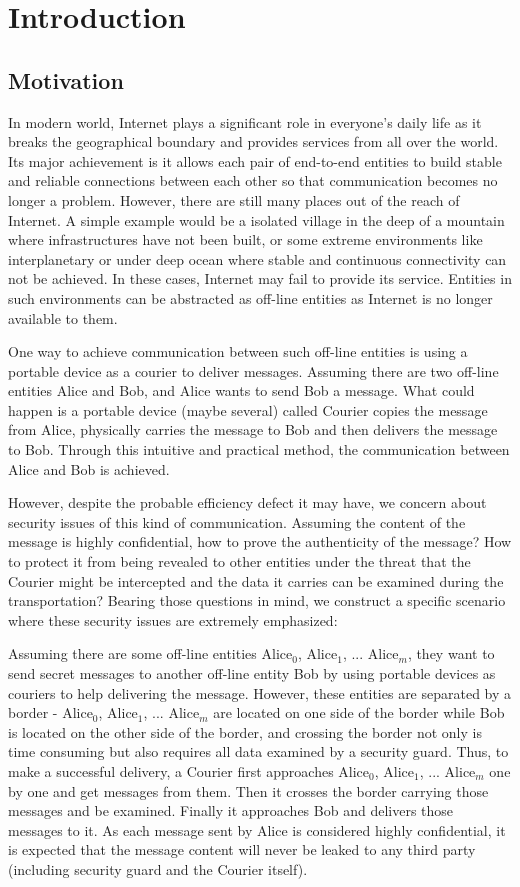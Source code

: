 \chapter{Introduction}
\section{Motivation}
In modern world, Internet plays a significant role in everyone's daily life as it breaks the geographical boundary and provides services from all over the world. Its major achievement is it allows each pair of end-to-end entities to build stable and reliable connections between each other so that communication becomes no longer a problem. However, there are still many places out of the reach of Internet. A simple example would be a isolated village in the deep of a mountain where infrastructures have not been built, or some extreme environments like interplanetary or under deep ocean where stable and continuous connectivity can not be achieved. In these cases, Internet may fail to provide its service. Entities in such environments can be abstracted as off-line entities as Internet is no longer available to them.

One way to achieve communication between such off-line entities is using a portable device as a courier to deliver messages. Assuming there are two off-line entities Alice and Bob, and Alice wants to send Bob a message. What could happen is a portable device (maybe several) called Courier copies the message from Alice, physically carries the message to Bob and then delivers the message to Bob. Through this intuitive and practical method, the communication between Alice and Bob is achieved.

However, despite the probable efficiency defect it may have, we concern about security issues of this kind of communication. Assuming the content of the message is highly confidential, how to prove the authenticity of the message? How to protect it from being revealed to other entities under the threat that the Courier might be intercepted and the data it carries can be examined during the transportation? Bearing those questions in mind, we construct a specific scenario where these security issues are extremely emphasized:

Assuming there are some off-line entities Alice$_0$, Alice$_1$, ... Alice$_m$, they want to send secret messages to another off-line entity Bob by using portable devices as couriers to help delivering the message. However, these entities are separated by a border - Alice$_0$, Alice$_1$, ... Alice$_m$ are located on one side of the border while Bob is located on the other side of the border, and crossing the border not only is time consuming but also requires all data examined by a security guard. Thus, to make a successful delivery, a Courier first approaches Alice$_0$, Alice$_1$, ... Alice$_m$ one by one and get messages from them. Then it crosses the border carrying those messages and be examined. Finally it approaches Bob and delivers those messages to it. As each message sent by Alice is considered highly confidential, it is expected that the message content will never be leaked to any third party (including security guard and the Courier itself).

